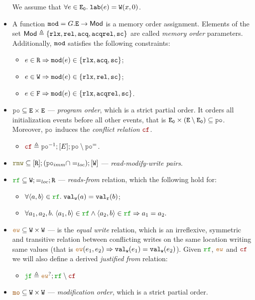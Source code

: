 \documentclass[12pt]{article}
\begin{document}
\begin{definition}
\begin{itemize}
\begin{itemize}
    \end{itemize}
    We assume that $\forall{e} \in {\mathtt{E_0}}. \; {\mathtt{lab}}(e) = {\mathtt{W}}({x},{0})$.
  \item A function ${\mathtt{mod}} = G.{\mathtt{E}} \rightarrow \mathsf{Mod}$ is a memory order assignment.
    Elements of the set $\mathsf{Mod} \triangleq \{ \mathtt{rlx}, {\mathtt{rel}}, {\mathtt{acq}}, {\mathtt{acqrel}}, {\mathtt{sc}} \}$ are
    called \emph{memory order} parameters.
    Additionally, ${\mathtt{mod}}$ satisfies the following constraints:
    \begin{itemize}
    \item $e \in {\mathtt{R}} \Rightarrow {\mathtt{mod}}(e) \in \{ \mathtt{rlx}, {\mathtt{acq}}, {\mathtt{sc}} \}$;
    \item $e \in {\mathtt{W}} \Rightarrow {\mathtt{mod}}(e) \in \{ \mathtt{rlx}, {\mathtt{rel}}, {\mathtt{sc}} \}$;
    \item $e \in {\mathtt{F}} \Rightarrow {\mathtt{mod}}(e) \in \{ \mathtt{rlx}, {\mathtt{acqrel}}, {\mathtt{sc}} \}$.
    \end{itemize}
  \item $\lPO \subseteq \lE \times \lE$ --- \emph{program order}, which is a strict partial order.
    It orders all initialization events before all other events,
    that is $\lEi \times (\lE \setminus \lEi) \subseteq \lPO$.
    Moreover, $\lPO$ induces the \emph{conflict relation} $\lCF$.
    \begin{itemize}
      \item  $\lCF \defeq \lPO^{-1};[E];\lPO \setminus \lPO^{=}$.
    \end{itemize}
  \item $\lRMW \subseteq [\lR];(\lPO_{imm} \cap =_{loc});[\lW]$ ---
    \emph{read-modify-write pairs}.
  \item $\lRF \subseteq \lW; =_{loc}; \lR$ --- \emph{reads-from} relation, which the following
    hold for:
    \begin{itemize}
    \item $\forall{\tup{a, b}} \in \lRF. \; \lVALW(a) = \lVALR(b)$;
    \item $\forall{a_1, a_2, b}. \; \tup{a_1, b} \in \lRF \wedge \tup{a_2, b} \in \lRF \Rightarrow a_1 = a_2.$
    \end{itemize}
  \item $\lEW \subseteq \lW \times \lW$ --- is the \emph{equal write} relation, 
    which is an irreflexive, symmetric and transitive relation between conflicting writes on the
    same location writing same values 
    (that is $\lEW(e_1, e_2) \Rightarrow \lVALW(e_1) = \lVALW(e_2)$).
    Given $\lRF$, $\lEW$ and $\lCF$ we will also define a derived \emph{justified from} relation:
    \begin{itemize}
      \item $\lJF \defeq \lEW^?;\lRF \setminus \lCF$
    \end{itemize}
  \item $\lMO \subseteq \lW \times \lW$ --- \emph{modification order}, which is a strict partial order.
  \end{itemize}
\end{definition}
\end{document}
